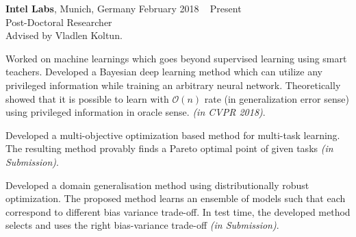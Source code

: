  \textbf{Intel Labs}, Munich, Germany \hfill February 2018 \textendash ~ Present \vspace{0mm}\\\vspace{0mm}
 \hspace{-2mm} Post-Doctoral Researcher  \hfill \vspace{1.5mm} \\
 Advised by Vladlen Koltun.

Worked on machine learnings which goes beyond supervised learning using smart teachers. Developed a Bayesian deep learning method which can utilize any privileged information while training an arbitrary neural network. Theoretically showed that it is possible to learn with $\mathcal{O}(n)$ rate (in generalization error sense) using privileged information in oracle sense. \emph{(in CVPR 2018)}. 

Developed a multi-objective optimization based method for multi-task learning. The resulting method provably finds a Pareto optimal point of given tasks \emph{(in Submission)}.

Developed a domain generalisation method using distributionally robust optimization. The proposed method learns an ensemble of models such that each correspond to different bias variance trade-off. In test time, the developed method selects and uses the right bias-variance trade-off \emph{(in Submission)}.